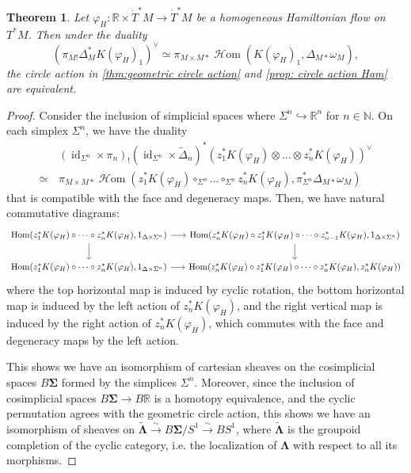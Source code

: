 \documentclass[11pt]{amsart}
\numberwithin{equation}{section}
\theoremstyle{plain}
\newtheorem{Thm}{Theorem}[section]
\theoremstyle{definition}
\theoremstyle{remark}
\newcommand{\bR} { {\mathbb{R}}}
\newcommand{\bN} { {\mathbb{N}}}
\newcommand{\id}{{\operatorname{id}}}
\newcommand\Hom{\operatorname{Hom}}
\newcommand\sHom{\operatorname{\mathscr{H}om}}
\begin{document}
\begin{Thm}
Let $\varphi_H: \bR \times \dot T^*M \to \dot T^*M$ be a homogeneous Hamiltonian flow on $T^*M$. Then under the duality
\[ (\pi_{M!} \Delta_M^*K(\varphi_H)_1)^\vee \simeq \pi_{M\times M*}\sHom(K(\varphi_H)_1, \Delta_{M*}\omega_M),\]
the circle action in \autoref{thm:geometric circle action} and \autoref{prop: circle action Ham} are equivalent.
\end{Thm}
\begin{proof}
Consider the inclusion of simplicial spaces where $\Sigma^n \hookrightarrow \bR^n$ for $n \in \bN$. On each simplex $\Sigma^n$, we have the duality
\begin{align*}
&\,(\id_{\Sigma^n} \times \pi_n)_!(\id_{\Sigma^n}\times \widetilde{\Delta}_n)^*(z_1^*K(\varphi_H) \otimes \dots \otimes z_n^*K(\varphi_H))^\vee \\
\simeq &\,\pi_{M\times M*}\sHom(z_1^*K(\varphi_H) \circ_{\Sigma^n} \dots \circ_{\Sigma^n} z_n^*K(\varphi_H), \pi_{\Sigma^n}^*\Delta_{M*}\omega_M)
\end{align*}
that is compatible with the face and degeneracy maps. Then, we have natural commutative diagrams:
\[\begin{tikzcd}[column sep=16pt]
\Hom(z_1^*K(\varphi_H) \circ \dots \circ z_n^*K(\varphi_H), 1_{\Delta\times \Sigma^n}) \ar[r] \ar[d] & \Hom(z_n^*K(\varphi_H)\circ z_1^*K(\varphi_H) \circ \dots \circ z_{n-1}^*K(\varphi_H), 1_{\Delta\times \Sigma^n}) \ar[d]\\
\Hom(z_1^*K(\varphi_H) \circ \dots \circ z_n^*K(\varphi_H), 1_{\Delta \times \Sigma^n}) \ar[r] & \Hom(z_n^*K(\varphi_H) \circ z_1^*K(\varphi_H) \circ \dots \circ z_n^*K(\varphi_H), z_n^*K(\varphi_H))
\end{tikzcd}\]
where the top horizontal map is induced by cyclic rotation, the bottom horizontal map is induced by the left action of $z_n^*K(\varphi_H)$, and the right vertical map is induced by the right action of $z_n^*K(\varphi_H)$, which commutes with the face and degeneracy maps by the left action.

This shows we have an isomorphism of cartesian sheaves on the cosimplicial spaces $B\boldsymbol{\Sigma}$ formed by the simplices $\Sigma^n$. Moreover, since the inclusion of cosimplicial spaces $B\boldsymbol{\Sigma} \to B\bR$ is a homotopy equivalence, and the cyclic permutation agrees with the geometric circle action, this shows we have an isomorphism of sheaves on $\widetilde{\boldsymbol{\Lambda}} \xrightarrow{\sim} B\boldsymbol{\Sigma}/S^1 \xrightarrow{\sim} BS^1$, where $\widetilde{\boldsymbol{\Lambda}}$ is the groupoid completion of the cyclic category, i.e. the localization of $\boldsymbol{\Lambda}$ with respect to all its morphisms.
\end{proof}
\end{document}
